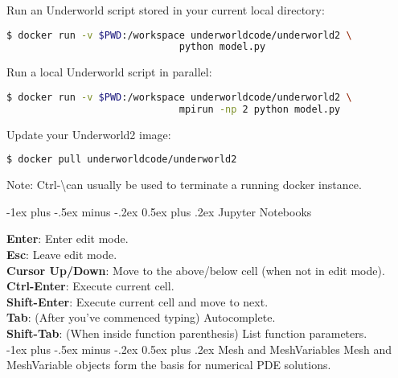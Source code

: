 \documentclass[10pt,landscape]{article}
\makeatletter
\renewcommand{\section}{\@startsection{section}{1}{0mm}%
                                {-1ex plus -.5ex minus -.2ex}%
                                {0.5ex plus .2ex}%
                                {\normalfont\large\bfseries}}
\makeatother
\begin{document}
\begin{multicols}{2}
\noindent Run an Underworld script stored in your current local directory:
\begin{lstlisting}[language=bash]
$ docker run -v $PWD:/workspace underworldcode/underworld2 \
                              python model.py
\end{lstlisting}

\noindent Run a local Underworld script in parallel:
\begin{lstlisting}[language=bash]
$ docker run -v $PWD:/workspace underworldcode/underworld2 \
                              mpirun -np 2 python model.py
\end{lstlisting}

\noindent Update your Underworld2 image:
\begin{lstlisting}[language=bash]
$ docker pull underworldcode/underworld2
\end{lstlisting}

Note: Ctrl-\textbackslash can usually be used to terminate a running docker instance.

\section{Jupyter Notebooks}

\textbf{Enter}: Enter edit mode. \\
\textbf{Esc}: Leave edit mode. \\
\textbf{Cursor Up/Down}: Move to the above/below cell (when not in edit mode). \\
\textbf{Ctrl-Enter}: Execute current cell. \\
\textbf{Shift-Enter}: Execute current cell and move to next. \\
\textbf{Tab}: (After you've commenced typing) Autocomplete. \\
\textbf{Shift-Tab}: (When inside function parenthesis) List function parameters. \\

\section{Mesh and MeshVariables}
Mesh and MeshVariable objects form the basis for numerical PDE solutions.
\newline


\end{multicols}
\end{document}
